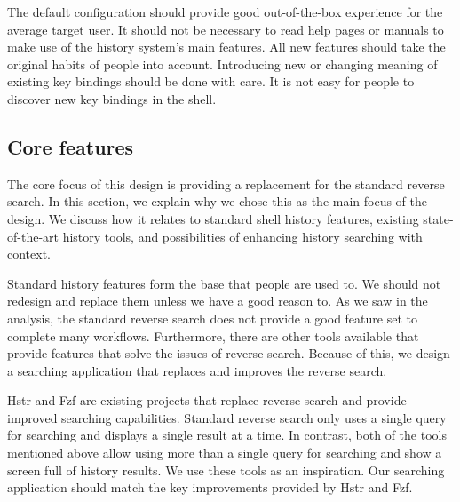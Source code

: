 The default configuration should provide good out-of-the-box experience for the average target user. It should not be necessary to read help pages or manuals to make use of the history system's main features. 
All new features should take the original habits of people into account. 
Introducing new or changing meaning of existing key bindings should be done with care. It is not easy for people to discover new key bindings in the shell.


\subsection{Core features}

The core focus of this design is providing a replacement for the standard reverse search. In this section, we explain why we chose this as the main focus of the design. We discuss how it relates to standard shell history features, existing state-of-the-art history tools, and possibilities of enhancing history searching with context.


Standard history features form the base that people are used to. We should not redesign and replace them unless we have a good reason to.
As we saw in the analysis, the standard reverse search does not provide a good feature set to complete many workflows. Furthermore, there are other tools available that provide features that solve the issues of reverse search. Because of this, we design a searching application that replaces and improves the reverse search.


Hstr\cite{toolshstr} and Fzf\cite{tools-fzf} are existing projects that replace reverse search and provide improved searching capabilities. 
Standard reverse search only uses a single query for searching and displays a single result at a time. In contrast, both of the tools mentioned above allow using more than a single query for searching and show a screen full of history results. We use these tools as an inspiration. Our searching application should match the key improvements provided by Hstr and Fzf. 


